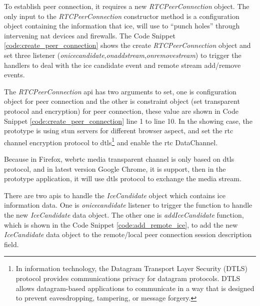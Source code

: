 \par To establish peer connection, it requires a new \textit{RTCPeerConnection} object. The only input to the \textit{RTCPeerConnection} constructor method is a configuration object containing the information that \gls{ice}, will use to “punch holes” through intervening \gls{nat} devices and firewalls. The Code Snippet \ref{code:create_peer_connection} shows the create \textit{RTCPeerConnection} object and set three listener (\textit{onicecandidate},\textit{onaddstream},\textit{onremovestream}) to trigger the handlers to deal with the \gls{ice} candidate event and remote stream add/remove events.

\par The \textit{RTCPeerConnection} \gls{api} has two arguments to set, one is configuration object for peer connection and the other is constraint object (set transparent protocol and encryption) for peer connection, these value are shown in Code Snippet \ref{code:create_peer_connection} line 1 to line 10. In the showing case, the prototype is using \gls{stun} servers for different browser aspect, and set the \gls{rtc} channel encryption protocol to \gls{dtls}\footnote{In information technology, the Datagram Transport Layer Security (DTLS) protocol provides communications privacy for datagram protocols. DTLS allows datagram-based applications to communicate in a way that is designed to prevent eavesdropping, tampering, or message forgery.\cite{wiki:dtls}} and enable the \gls{rtc} DataChannel.

\par Because in Firefox, \gls{webrtc} media transparent channel is only based on \gls{dtls} protocol, and in latest version Google Chrome, it is support, then in the prototype application, it will use \gls{dtls} protocol to exchange the media stream.

\par There are two \gls{api}s to handle the \textit{IceCandidate} object which contains \gls{ice} information data. One is \textit{onicecandidate} listener to trigger the function to handle the new \textit{IceCandidate} data object. The other one is \textit{addIceCandidate} function, which is shown in the Code Snippet \ref{code:add_remote_ice}, to add the new \textit{IceCandidate} data object to the remote/local peer connection session description field. 

